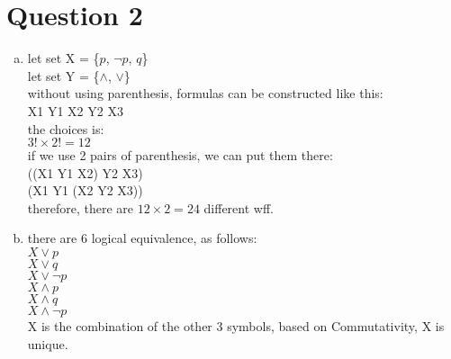 \documentclass[11pt, a4paper]{article}
\begin{document}
\section*{Question 2}
\begin{enumerate}[(a)]
    \item
        let set X = \{$p$, $\neg p$, $q$\}\\
        let set Y = \{$\land$, $\lor$\}\\
        without using parenthesis, formulas can be constructed like this:\\
        X1 Y1 X2 Y2 X3\\
        the choices is:\\
        $3! \times 2! = 12$\\
        if we use 2 pairs of parenthesis, we can put them there:\\
        ((X1 Y1 X2) Y2 X3)\\
        (X1 Y1 (X2 Y2 X3))\\
        therefore, there are $12 \times 2 = 24$ different wff.
    \item
        there are 6 logical equivalence, as follows:\\
        $X \lor p$\\
        $X \lor q$\\
        $X \lor \neg p$\\
        $X \land p$\\
        $X \land q$\\
        $X \land \neg p$\\
        X is the combination of the other 3 symbols, based on Commutativity, X is unique.

    \end{enumerate}
\end{document}
